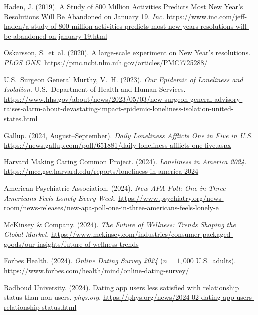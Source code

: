 \documentclass[11pt,a4paper]{article}
\begin{document}
\begin{enumerate}[label={[\arabic*]}, leftmargin=*, itemsep=2pt]
  \item Haden, J. (2019). A Study of 800 Million Activities Predicts Most New Year's Resolutions Will Be Abandoned on January 19. \textit{Inc.} \url{https://www.inc.com/jeff-haden/a-study-of-800-million-activities-predicts-most-new-years-resolutions-will-be-abandoned-on-january-19.html}

  \item Oskarsson, S.~et~al. (2020). A large-scale experiment on New Year's resolutions. \textit{PLOS ONE}. \url{https://pmc.ncbi.nlm.nih.gov/articles/PMC7725288/}

  \item U.S.~Surgeon General Murthy, V.~H. (2023). \textit{Our Epidemic of Loneliness and Isolation}. U.S.\ Department of Health and Human Services. \url{https://www.hhs.gov/about/news/2023/05/03/new-surgeon-general-advisory-raises-alarm-about-devastating-impact-epidemic-loneliness-isolation-united-states.html}

  \item Gallup. (2024, August--September). \textit{Daily Loneliness Afflicts One in Five in U.S.} \url{https://news.gallup.com/poll/651881/daily-loneliness-afflicts-one-five.aspx}

  \item Harvard Making Caring Common Project. (2024). \textit{Loneliness in America 2024}. \url{https://mcc.gse.harvard.edu/reports/loneliness-in-america-2024}

  \item American Psychiatric Association. (2024). \textit{New APA Poll: One in Three Americans Feels Lonely Every Week}. \url{https://www.psychiatry.org/news-room/news-releases/new-apa-poll-one-in-three-americans-feels-lonely-e}

  \item McKinsey \& Company. (2024). \textit{The Future of Wellness: Trends Shaping the Global Market}. \url{https://www.mckinsey.com/industries/consumer-packaged-goods/our-insights/future-of-wellness-trends}

  \item Forbes Health. (2024). \textit{Online Dating Survey 2024} ($n=1{,}000$ U.S.\ adults). \url{https://www.forbes.com/health/mind/online-dating-survey/}

  \item Radboud University. (2024). Dating app users less satisfied with relationship status than non-users. \textit{phys.org}. \url{https://phys.org/news/2024-02-dating-app-users-relationship-status.html}


\end{enumerate}
\end{document}
